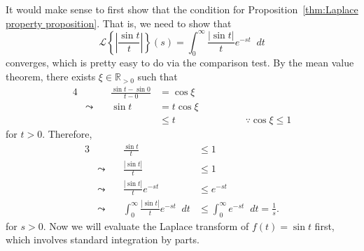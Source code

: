 \documentclass[a4paper]{article}
\newcommand*\diff{\mathop{}\!d} %
\theoremstyle{definition}
\begin{document}
It would make sense to first show that the condition for Proposition~\ref{thm:Laplace property proposition}.
That is, we need to show that
\begin{equation*}
    \mathscr{L} \left\{\left|\frac{\sin t}{t}\right|\right\}(s) = \int_{0}^{\infty} \frac{|\sin t|}{t} e^{-st} \diff t
\end{equation*}
converges, which is pretty easy to do via the comparison test.
By the mean value theorem, there exists $\xi \in \mathbb{R}_{>0}$ such that
\begin{alignat*}{4}
     &                & \frac{\sin t - \sin 0}{t - 0} & = \cos \xi   &                                       \\
     & \leadsto \quad & \sin t                        & = t \cos \xi &                                       \\
     &                &                               & \leq t       & \qquad\qquad \because \cos \xi \leq 1
\end{alignat*}
for $t>0$.
Therefore,
\begin{alignat*}{3}
     &                & \frac{\sin t}{t}                                     & \leq 1                                                \\
     & \leadsto \quad & \frac{|\sin t|}{t}                                   & \leq 1                                                \\
     & \leadsto\quad  & \frac{|\sin t|}{t} e^{-st}                           & \leq e^{-st}                                          \\
     & \leadsto \quad & \int_{0}^{\infty} \frac{|\sin t|}{t} e^{-st} \diff t & \leq \int_{0}^{\infty} e^{-st} \diff t = \frac{1}{s}.
\end{alignat*}
for $s>0$.
Now we will evaluate the Laplace transform of $f(t) = \sin t$ first, which involves standard integration by parts.
\end{document}
